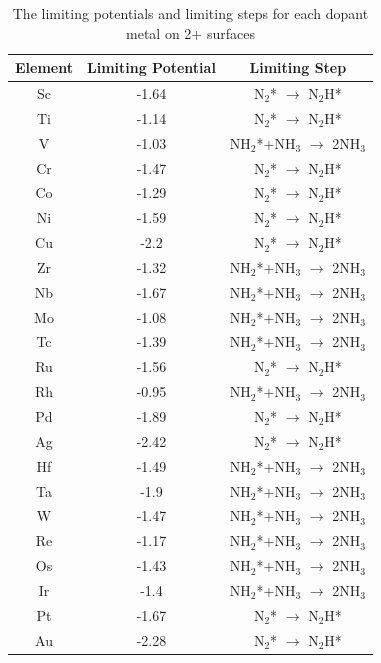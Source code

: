 \documentclass[journal=jacsat,manuscript=article]{achemso}
\begin{document}
\begin{table}
\begin{center}
\begin{tabular}{| c | c |c |}
\hline
Element & Limiting Potential & Limiting Step \\
\hline
Sc & -1.64 & N$_2$* $\rightarrow$ N$_2$H*\\
Ti & -1.14 & N$_2$* $\rightarrow$ N$_2$H*\\
V & -1.03 & NH$_2$*+NH$_3$ $\rightarrow$ 2NH$_3$\\
Cr & -1.47 & N$_2$* $\rightarrow$ N$_2$H*\\
Co & -1.29 & N$_2$* $\rightarrow$ N$_2$H*\\
Ni & -1.59 & N$_2$* $\rightarrow$ N$_2$H*\\
Cu & -2.2 & N$_2$* $\rightarrow$ N$_2$H*\\
Zr & -1.32 & NH$_2$*+NH$_3$ $\rightarrow$ 2NH$_3$\\
Nb & -1.67 & NH$_2$*+NH$_3$ $\rightarrow$ 2NH$_3$\\
Mo & -1.08 & NH$_2$*+NH$_3$ $\rightarrow$ 2NH$_3$\\
Tc & -1.39 & NH$_2$*+NH$_3$ $\rightarrow$ 2NH$_3$\\
Ru & -1.56 & N$_2$* $\rightarrow$ N$_2$H*\\
Rh & -0.95 & NH$_2$*+NH$_3$ $\rightarrow$ 2NH$_3$\\
Pd & -1.89 & N$_2$* $\rightarrow$ N$_2$H*\\
Ag & -2.42 & N$_2$* $\rightarrow$ N$_2$H*\\
Hf & -1.49 & NH$_2$*+NH$_3$ $\rightarrow$ 2NH$_3$\\
Ta & -1.9 & NH$_2$*+NH$_3$ $\rightarrow$ 2NH$_3$\\
W & -1.47 & NH$_2$*+NH$_3$ $\rightarrow$ 2NH$_3$\\
Re & -1.17 & NH$_2$*+NH$_3$ $\rightarrow$ 2NH$_3$\\
Os & -1.43 & NH$_2$*+NH$_3$ $\rightarrow$ 2NH$_3$\\
Ir & -1.4 & NH$_2$*+NH$_3$ $\rightarrow$ 2NH$_3$\\
Pt & -1.67 & N$_2$* $\rightarrow$ N$_2$H*\\
Au & -2.28 & N$_2$* $\rightarrow$ N$_2$H*\\
\hline
\end{tabular}
\end{center}
\caption{The limiting potentials and limiting steps for each dopant metal on 2+ surfaces}\label{table:pot_limiting_steps}\end{table}\begin{table}

\end{table}
\end{document}

